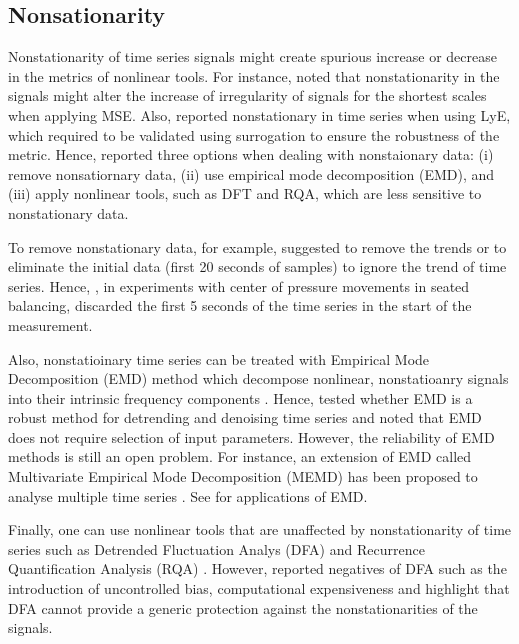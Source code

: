 \subsection{Nonsationarity}
Nonstationarity of time series signals might create
spurious increase or decrease in the metrics of nonlinear tools. 
For instance, \cite{costa2007} noted that nonstationarity in the signals might 
alter the increase of irregularity of signals for the shortest scales when 
applying MSE.  Also, \cite{dingwell2000} reported nonstationary in time series 
when using LyE, which required to be validated using surrogation 
to ensure the robustness of the metric. 
Hence, \cite{caballero2014} reported three options when dealing with 
nonstaionary data: (i) remove nonsatiornary data, (ii) use empirical mode 
decomposition (EMD), and (iii) apply nonlinear tools, such as DFT and RQA, 
which are less sensitive to nonstationary data.

To remove nonstationary data, for example, \cite{carroll1993} suggested 
to remove the trends or to eliminate the initial data (first 20 seconds 
of samples) to ignore the trend of time series. %
Hence, \cite{vandieen2010}, in experiments with center of pressure movements 
in seated balancing, discarded the first 5 seconds of the time series 
in the start of the measurement.

Also, nonstatioinary time series can be treated with Empirical Mode 
Decomposition (EMD) method which decompose nonlinear, nonstatioanry signals 
into their intrinsic frequency components \citep{huang1998, wu-huang2004, 
wu-huang2009}. Hence, \cite{flandrin2004, costa2007} tested whether EMD is a 
robust method for detrending and denoising time series and noted that 
 EMD does not require selection of input parameters. However, the reliability 
of EMD methods is still an open problem. For instance, an extension of EMD 
called Multivariate Empirical Mode Decomposition (MEMD) has been proposed 
to analyse multiple time series \citep{rehman2010, mandic2013}.
See \citep{wu-hu2006, costa2007, daubechies2011, bonnet2014, mert2018}
for applications of EMD.


Finally, one can use nonlinear tools that are unaffected by nonstationarity
of time series such as Detrended Fluctuation Analys (DFA) \citep{hausdorff1995}
and Recurrence Quantification Analysis (RQA) \citep{zbilut1992, trulla1996, 
marwan2008}. 
However, \cite{bryce2012} reported negatives of DFA such as the introduction
of uncontrolled bias, computational expensiveness and highlight 
that DFA cannot provide a generic protection against the nonstationarities 
of the signals.



